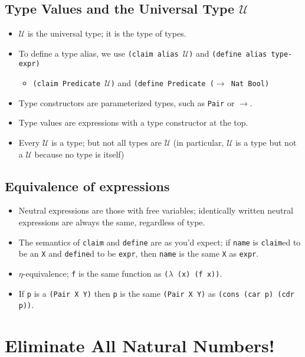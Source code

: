 \documentclass{article}
\newcommand{\ttt}[1]{\texttt{#1}}
\begin{document}
\subsection{Type Values and the Universal Type \(\mathcal{U}\)}
\begin{itemize}
    \item \ttt{\(\mathcal{U}\)} is the universal type; it is the type of types.
    \item To define a type alias, we use \ttt{(claim alias \(\mathcal{U}\))} and \ttt{(define alias type-expr)}
        \begin{itemize}
            \item \ttt{(claim Predicate \(\mathcal{U}\))} and \ttt{(define Predicate (\(\rightarrow\) Nat Bool)}
        \end{itemize}
    \item Type constructors are parameterized types, such as \ttt{Pair} or \ttt{\(\rightarrow\)}.
    \item Type values are expressions with a type constructor at the top.
    \item Every \(\mathcal{U}\) is a type; but not all types are \(\mathcal{U}\) (in particular, \(\mathcal{U}\) is a type but not a \(\mathcal{U}\) because no type is itself)
\end{itemize}
\subsection{Equivalence of expressions}
\begin{itemize}
    \item Neutral expressions are those with free variables; identically written neutral expressions are always the same, regardless of type.
    \item The semantics of \ttt{claim} and \ttt{define} are as you'd expect; if \ttt{name} is \ttt{claim}ed to be an \ttt{X} and \ttt{define}d to be \ttt{expr}, then \ttt{name} is the same \ttt{X} as \ttt{expr}.
    \item \(\eta\)-equivalence; \ttt{f} is the same function as \ttt{(\(\lambda\) (x) (f x))}.
    \item If \ttt{p} is a \ttt{(Pair X Y)} then \ttt{p} is the same \ttt{(Pair X Y)} as \ttt{(cons (car p) (cdr p))}.
\end{itemize}
\section{Eliminate All Natural Numbers!}
\end{document}
